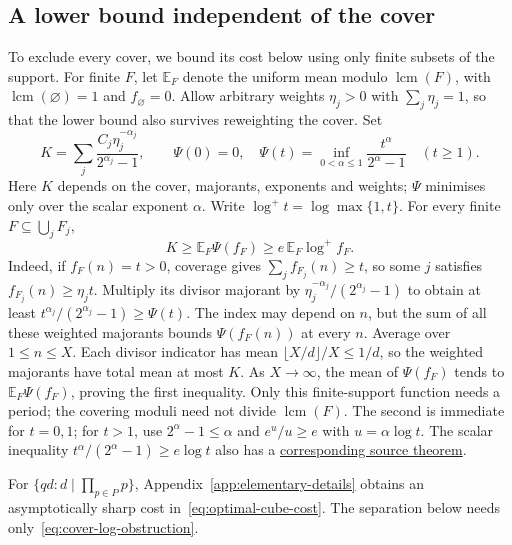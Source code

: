 \documentclass[11pt]{article}
\begin{document}
\subsection{A lower bound independent of the cover}
To exclude every cover, we bound its cost below using only finite
subsets of the support. For finite $F$, let $\mathbb E_F$ denote
the uniform mean modulo $\operatorname{lcm}(F)$, with
$\operatorname{lcm}(\varnothing)=1$ and $f_{\varnothing}=0$.
Allow arbitrary weights $\eta_j>0$ with $\sum_j\eta_j=1$, so that the
lower bound also survives reweighting the cover. Set
\[
 K=\sum_j\frac{C_j\eta_j^{-\alpha_j}}{2^{\alpha_j}-1},\qquad
 \Psi(0)=0,\quad
 \Psi(t)=\inf_{0<\alpha\le1}\frac{t^\alpha}{2^\alpha-1}\quad(t\ge1).
\]
Here $K$ depends on the cover, majorants, exponents and weights;
$\Psi$ minimises only over the scalar exponent $\alpha$.
Write $\log^+t=\log\max\{1,t\}$. For every finite
$F\subseteq\bigcup_jF_j$,
\begin{equation}
 K\ge\mathbb E_F\Psi(f_F)\ge e\,\mathbb E_F\log^+f_F.
 \label{eq:cover-log-obstruction}
\end{equation}
Indeed, if $f_F(n)=t>0$, coverage gives
$\sum_jf_{F_j}(n)\ge t$, so some $j$ satisfies
$f_{F_j}(n)\ge\eta_jt$. Multiply its divisor majorant by
$\eta_j^{-\alpha_j}/(2^{\alpha_j}-1)$ to obtain at least
$t^{\alpha_j}/(2^{\alpha_j}-1)\ge\Psi(t)$.
The index may depend on $n$, but the sum of all these weighted majorants
bounds $\Psi(f_F(n))$ at every $n$.
Average over $1\le n\le X$. Each divisor indicator has mean
$\lfloor X/d\rfloor/X\le1/d$, so the weighted majorants have total
mean at most $K$. As $X\to\infty$, the mean of $\Psi(f_F)$ tends to
$\mathbb E_F\Psi(f_F)$, proving the first inequality. Only this
finite-support function needs a period; the covering moduli need not
divide $\operatorname{lcm}(F)$. The second is immediate for $t=0,1$;
for $t>1$, use $2^\alpha-1\le\alpha$ and $e^u/u\ge e$ with
$u=\alpha\log t$.  The scalar inequality
$t^\alpha/(2^\alpha-1)\ge e\log t$ also has a
\href{https://github.com/wcook04/plectis-erdos/blob/c91562bd574a387cde904481e609c7b4cacebb14/lean/ErdosProblems/Erdos257/PaperCompleteR7/CoverKernel.lean\#L170}{corresponding source theorem}.

For $\{qd:d\mid\prod_{p\in P}p\}$, Appendix~\ref{app:elementary-details}
obtains an asymptotically sharp cost in~\eqref{eq:optimal-cube-cost}.
The separation below needs only~\eqref{eq:cover-log-obstruction}.
\end{document}
